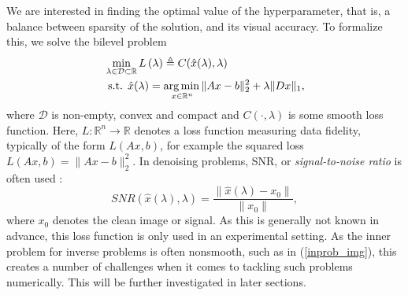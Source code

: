 \documentclass[11pt, twoside]{report}
\begin{document}
We are interested in finding the optimal value of the hyperparameter, that is, a balance between sparsity of the solution, and its visual accuracy. To formalize this, we solve the bilevel problem
\begin{align} 
&\min _{\lambda \in \mathcal{D} \subset \mathbb{R}} L\left(\lambda \right) \triangleq C(\hat{x}(\lambda), \lambda) \label{bilev1_img}\\
&\text { s.t. } \hat{x}(\lambda) =\underset{x \in \mathbb{R}^{n}} {\operatorname*{arg\, min \,}} \|Ax-b\|_2^2 + \lambda\|Dx\|_1 \label{inprob_img},
\end{align}
where $\mathcal{D}$ is non-empty, convex and compact and $C(\cdot,\lambda)$ is some smooth loss function. Here, $L : \mathbb{R}^n \to \mathbb{R}$ denotes a loss function measuring data fidelity, typically of the form $L(Ax, b)$, for example the squared loss $L(Ax,b)=\|Ax-b\|_2^2$. In denoising problems, SNR, or {\em signal-to-noise ratio} is often used \cite{gonzalez2008digital}:
\begin{equation}
    SNR(\hat{x}(\lambda), \lambda) = \frac{\|\hat{x}(\lambda) - x_0\|}{\|x_0\|},
\end{equation}
where $x_0$ denotes the clean image or signal. As this is generally not known in advance, this loss function is only used in an experimental setting. As the inner problem for inverse problems is often nonsmooth, such as in (\ref{inprob_img}), this creates a number of challenges when it comes to tackling such problems numerically. This will be further investigated in later sections.
\end{document}
